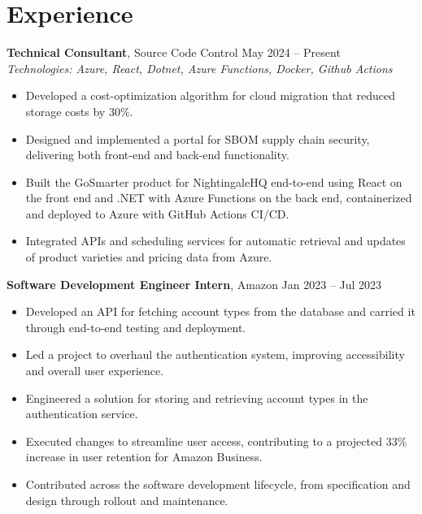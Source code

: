 \documentclass[11pt,a4paper]{article}
\begin{document}
\section{Experience}
\textbf{Technical Consultant}, Source Code Control \hfill May 2024 -- Present
\\ \textit{Technologies: Azure, React, Dotnet, Azure Functions, Docker, Github Actions}
\begin{itemize}
  \item Developed a cost-optimization algorithm for cloud migration that reduced storage costs by 30\%.
  \item Designed and implemented a portal for SBOM supply chain security, delivering both front-end and back-end functionality.
  \item Built the GoSmarter product for NightingaleHQ end-to-end using React on the front end and .NET with Azure Functions on the back end, containerized and deployed to Azure with GitHub Actions CI/CD.
  \item Integrated APIs and scheduling services for automatic retrieval and updates of product varieties and pricing data from Azure.
\end{itemize}
\vspace{2pt}
\textbf{Software Development Engineer Intern}, Amazon \hfill Jan 2023 -- Jul 2023
\begin{itemize}
  \item Developed an API for fetching account types from the database and carried it through end-to-end testing and deployment.
  \item Led a project to overhaul the authentication system, improving accessibility and overall user experience.
  \item Engineered a solution for storing and retrieving account types in the authentication service.
  \item Executed changes to streamline user access, contributing to a projected 33\% increase in user retention for Amazon Business.
  \item Contributed across the software development lifecycle, from specification and design through rollout and maintenance.
\end{itemize}
\vspace{2pt}
\end{document}
